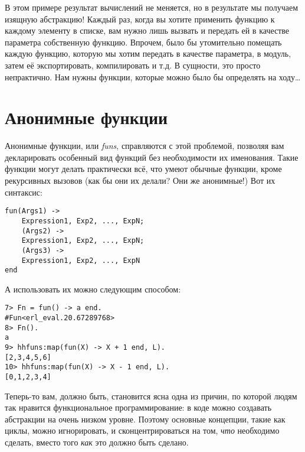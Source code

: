 В этом примере результат вычислений не меняется, но в результате мы получаем изящную абстракцию! Каждый раз, когда вы хотите применить функцию к каждому элементу в списке, вам нужно лишь вызвать  и передать ей в качестве параметра собственную функцию. Впрочем, было бы утомительно помещать каждую функцию, которую мы хотим передать  в качестве параметра, в модуль, затем её экспортировать, компилировать и т.д. В сущности, это просто непрактично. Нам нужны функции, которые можно было бы определять на ходу\ldots
\section{Анонимные функции}
\label{anonymous-functions}
Анонимные функции, или \emph{funs}, справляются с этой проблемой, позволяя вам декларировать особенный вид функций без необходимости их именования. Такие функции могут делать практически всё, что умеют обычные функции, кроме рекурсивных вызовов (как бы они их делали? Они же анонимные!) Вот их синтаксис:
\begin{lstlisting}[style=erlang]
fun(Args1) ->
    Expression1, Exp2, ..., ExpN;
    (Args2) ->
    Expression1, Exp2, ..., ExpN;
    (Args3) ->
    Expression1, Exp2, ..., ExpN
end
\end{lstlisting}
А использовать их можно следующим способом:
\begin{lstlisting}[style=erlang]
7> Fn = fun() -> a end.
#Fun<erl_eval.20.67289768>
8> Fn().
a
9> hhfuns:map(fun(X) -> X + 1 end, L).
[2,3,4,5,6]
10> hhfuns:map(fun(X) -> X - 1 end, L).
[0,1,2,3,4]
\end{lstlisting}
Теперь\--то вам, должно быть, становится ясна одна из причин, по которой людям так нравится функциональное программирование: в коде можно создавать абстракции на очень низком уровне. Поэтому основные концепции, такие как циклы, можно игнорировать, и сконцентрироваться на том, \emph{что} необходимо сделать, вместо того \emph{как} это должно быть сделано.

